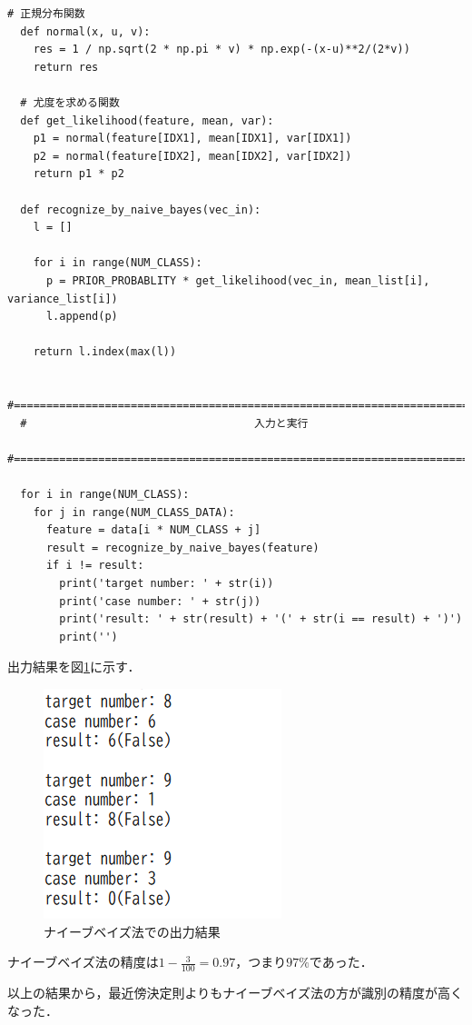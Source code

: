 \documentclass{jlreq}
\numberwithin{equation}{section}
\begin{document}
\begin{lstlisting}[caption={ナイーブベイズ法による識別部の実装}, label=src:naive]
  # 正規分布関数
  def normal(x, u, v):
    res = 1 / np.sqrt(2 * np.pi * v) * np.exp(-(x-u)**2/(2*v))
    return res
  
  # 尤度を求める関数
  def get_likelihood(feature, mean, var):
    p1 = normal(feature[IDX1], mean[IDX1], var[IDX1])
    p2 = normal(feature[IDX2], mean[IDX2], var[IDX2])
    return p1 * p2
  
  def recognize_by_naive_bayes(vec_in):
    l = []
  
    for i in range(NUM_CLASS):
      p = PRIOR_PROBABLITY * get_likelihood(vec_in, mean_list[i], variance_list[i])
      l.append(p)
  
    return l.index(max(l))
  
  #===============================================================================
  #                                   入力と実行
  #===============================================================================
  
  for i in range(NUM_CLASS):
    for j in range(NUM_CLASS_DATA):
      feature = data[i * NUM_CLASS + j]
      result = recognize_by_naive_bayes(feature)
      if i != result:
        print('target number: ' + str(i))
        print('case number: ' + str(j))
        print('result: ' + str(result) + '(' + str(i == result) + ')')
        print('')
\end{lstlisting}

出力結果を図\ref{fig:result_naive}に示す．
\begin{figure}[H]
  \centering
  \includegraphics{image/naive_result.png}
  \caption{ナイーブベイズ法での出力結果}
  \label{fig:result_naive}
\end{figure}

ナイーブベイズ法の精度は$1 - \frac{3}{100} = 0.97$，つまり$97\si{\percent}$であった．

以上の結果から，最近傍決定則よりもナイーブベイズ法の方が識別の精度が高くなった．
\end{document}
